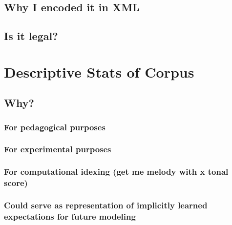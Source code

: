 \documentclass[]{book}
\theoremstyle{definition}
\theoremstyle{definition}
\theoremstyle{definition}
\theoremstyle{remark}
\begin{document}
\hypertarget{why-i-encoded-it-in-xml}{%
\subsection{Why I encoded it in XML}\label{why-i-encoded-it-in-xml}}

\hypertarget{is-it-legal}{%
\subsection{Is it legal?}\label{is-it-legal}}

\hypertarget{descriptive-stats-of-corpus}{%
\section{Descriptive Stats of
Corpus}\label{descriptive-stats-of-corpus}}

\hypertarget{why-1}{%
\subsection{Why?}\label{why-1}}

\hypertarget{for-pedagogical-purposes}{%
\subsubsection{For pedagogical
purposes}\label{for-pedagogical-purposes}}

\hypertarget{for-experimental-purposes}{%
\subsubsection{For experimental
purposes}\label{for-experimental-purposes}}

\hypertarget{for-computational-idexing-get-me-melody-with-x-tonal-score}{%
\subsubsection{For computational idexing (get me melody with x tonal
score)}\label{for-computational-idexing-get-me-melody-with-x-tonal-score}}

\hypertarget{could-serve-as-representation-of-implicitly-learned-expectations-for-future-modeling}{%
\subsubsection{Could serve as representation of implicitly learned
expectations for future
modeling}\label{could-serve-as-representation-of-implicitly-learned-expectations-for-future-modeling}}
\end{document}
